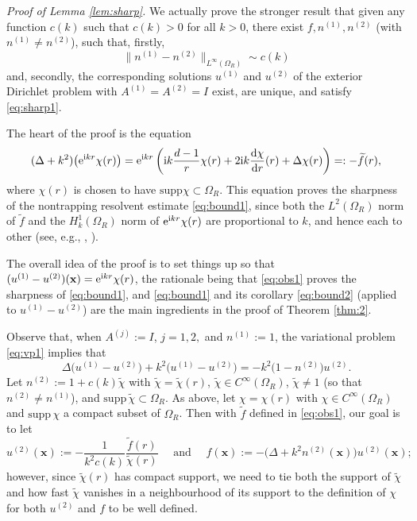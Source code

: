 \documentclass[10pt]{article}%
\newenvironment{proof}[1][Proof]{\noindent \emph{#1.} }
{\hfill \ \rule{0.5em}{0.5em}}
\numberwithin{equation}{section}
\newcommand{\beq}{\begin{equation}}
\newcommand{\eeq}{\end{equation}}
\newcommand{\beqs}{\begin{equation*}}
\newcommand{\eeqs}{\end{equation*}}
\newcommand{\bpf}{\begin{proof}}
\newcommand{\bx}{\mathbf{x}}
\newcommand{\supp}{\mathrm{supp}}
\newcommand{\re}{{\rm e}}
\newcommand{\ri}{{\rm i}}
\newcommand{\rd}{{\rm d}}
\newcommand{\diff}[2]{\frac{\rd #1}{\rd #2}}
\newcommand{\HoDkk}{{H^1_{k}(\domain_R)}}
\newcommand{\tand}{\text{ and }}
\newcommand{\domain}{\Omega}
\newcommand{\coeffAj}{A^{(j)}}
\newcommand{\coeffAo}{A^{(1)}}
\newcommand{\coeffAt}{A^{(2)}}
\newcommand{\coeffno}{n^{(1)}}
\newcommand{\coeffnt}{n^{(2)}}
\begin{document}
\bpf[Proof of Lemma \ref{lem:sharp}]
We actually prove the stronger result that given any function $c(k)$ such that $c(k)>0$ for all $k>0$, there exist 
$f, \coeffno, \coeffnt$ (with $\coeffno\not= \coeffnt$), such that, firstly,
\beqs
\big\|\coeffno-\coeffnt\big\|_{L^\infty(\Omega_R)} \sim c(k)
\eeqs
and, secondly,
the corresponding solutions $u^{(1)}$ and $u^{(2)}$ of the exterior Dirichlet problem with $\coeffAo = \coeffAt= I$ exist, are unique, and satisfy \eqref{eq:sharp1}. 

The heart of the proof is the equation
\beq\label{eq:obs1}
(\Delta + k^2) \big(\re^{\ri k r}\chi(r)\big) =  \re^{\ri k r}\left(\ri k \frac{d-1}{r} \chi(r) + 2 \ri k \diff{\chi}{r}(r) + \Delta \chi(r)\right)=: -\widetilde{f}(r),
\eeq
where $\chi(r)$ is chosen to have $\supp \chi \subset \Omega_R$.
This equation proves the sharpness of the nontrapping resolvent estimate \eqref{eq:bound1}, since both the $L^2(\Omega_R)$ norm of $\widetilde{f}$ and the $\HoDkk$ norm of $\re^{\ri kr}\chi(r)$ are proportional to $k$, and hence each to other (see, e.g., \cite[Lemma 3.10]{ChMo:08},  \cite[Lemma 4.12]{Sp:14}).

The overall idea of the proof is to set things up so that $(u^{(1)}-u^{(2)})(\bx) = \re^{\ri k r}\chi(r)$, the rationale being that \eqref{eq:obs1} proves the sharpness of \eqref{eq:bound1}, and \eqref{eq:bound1} and its corollary \eqref{eq:bound2} (applied to $u^{(1)}-u^{(2)}$) are the main ingredients in the proof of Theorem \ref{thm:2}.

Observe that, when $\coeffAj:=I$, $j=1,2,$ and $\coeffno:=1$, the variational problem \eqref{eq:vp1} implies that 
\beq\label{eq:obs2}
\Delta \big( u^{(1)} - u^{(2)}\big) + k^2 \big( u^{(1)} - u^{(2)}\big) = -k^2 \big(1-\coeffnt\big)u^{(2)}.
\eeq
Let $\coeffnt:= 1 + c(k)\widetilde{\chi}$ with $\widetilde{\chi}= \widetilde{\chi}(r)$, $\widetilde{\chi}\in C^{\infty}(\Omega_R)$, $\widetilde{\chi}\not = 1$ (so that $\coeffnt\not = \coeffno$), and 
 $\supp \, \widetilde{\chi} \subset\Omega_R$. 
As above, let $\chi=\chi(r)$ with $\chi \in C^{\infty}(\Omega_R)$ and
$\supp \,\chi$ a compact subset of $\Omega_R$. Then with $\widetilde{f}$ defined in \eqref{eq:obs1}, our goal is to let 
\beq\label{eq:obs3}
u^{(2)}(\bx):= -\frac{1}{k^2 c(k)}\frac{\widetilde{f}(r)}{\widetilde{\chi}(r)} \quad\tand\quad  f(\bx):= -\big(\Delta +k^2 \coeffnt(\bx)\big) u^{(2)}(\bx);
\eeq
however, since $\widetilde{\chi}(r)$ has compact support, we need to tie both the support of $\widetilde{\chi}$ and how fast $\widetilde{\chi}$ vanishes in a neighbourhood of its support to the definition of $\chi$ for both $u^{(2)}$ and $f$ to be well defined.
\end{document}
